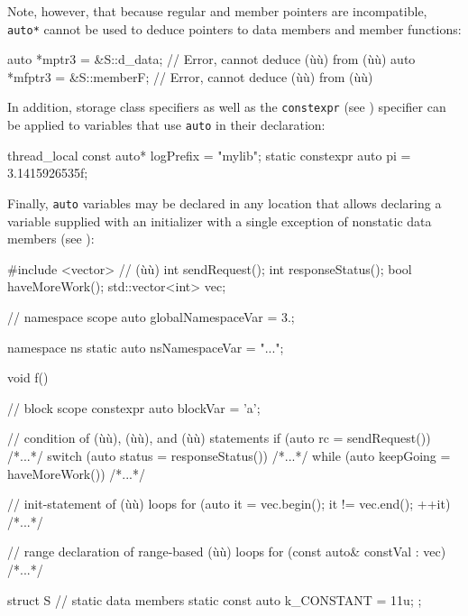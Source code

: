 \noindent Note, however, that because regular and member pointers are
incompatible, \lstinline!auto*! cannot be used to deduce pointers to data
members and member functions:

\begin{emcppslisting}[emcppsbatch=e2]
auto *mptr3  = &S::d_data;   // Error, cannot deduce (ù{}ù) from (ù{}ù)
auto *mfptr3 = &S::memberF;  // Error, cannot deduce (ù{}ù) from (ù{}ù)
\end{emcppslisting}

\noindent In addition, storage class specifiers as well as the \lstinline!constexpr!
(see ) specifier can be
applied to variables that use \lstinline!auto! in their declaration:

\begin{emcppslisting}
thread_local     const auto* logPrefix = "mylib";
static constexpr       auto  pi        = 3.1415926535f;
\end{emcppslisting}

\noindent Finally, \lstinline!auto! variables may be declared in any location that
allows declaring a variable supplied with an initializer with a single
exception of nonstatic data members (see ):


\begin{emcppshiddenlisting}[emcppsbatch=e3]
#include <vector>     // (ù{}ù)
int sendRequest();
int responseStatus();
bool haveMoreWork();
std::vector<int> vec;
\end{emcppshiddenlisting}
\begin{emcppslisting}[emcppsbatch=e3]
// namespace scope
auto globalNamespaceVar = 3.;

namespace ns
{
    static auto nsNamespaceVar = "...";
}

void f()
{
    // block scope
    constexpr auto blockVar = 'a';

    // condition of (ù{}ù), (ù{}ù), and (ù{}ù) statements
    if     (auto rc        = sendRequest())    { /*...*/ }
    switch (auto status    = responseStatus()) { /*...*/ }
    while  (auto keepGoing = haveMoreWork())   { /*...*/ }

    // init-statement of (ù{}ù) loops
    for (auto it = vec.begin(); it != vec.end(); ++it) { /*...*/ }

    // range declaration of range-based (ù{}ù) loops
    for (const auto& constVal : vec) { /*...*/ }
}

struct S
{
    // static data members
    static const auto k_CONSTANT = 11u;
};
\end{emcppslisting}


